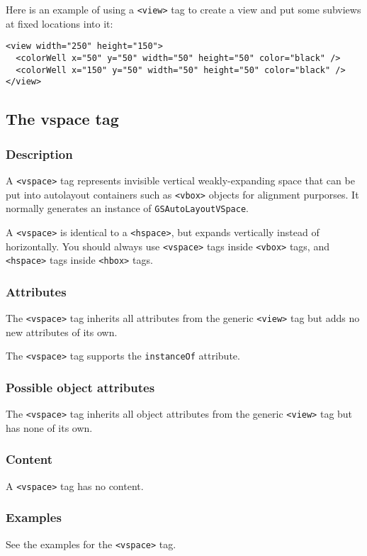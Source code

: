 Here is an example of using a \texttt{<view>} tag to create a view and
put some subviews at fixed locations into it:
\begin{verbatim}
<view width="250" height="150">
  <colorWell x="50" y="50" width="50" height="50" color="black" />
  <colorWell x="150" y="50" width="50" height="50" color="black" />
</view>
\end{verbatim}

\subsection{The vspace tag}

\subsubsection{Description}

A \texttt{<vspace>} tag represents invisible vertical weakly-expanding
space that can be put into autolayout containers such as
\texttt{<vbox>} objects for alignment purporses.  It normally
generates an instance of \texttt{GSAutoLayoutVSpace}.

A \texttt{<vspace>} is identical to a \texttt{<hspace>}, but expands
vertically instead of horizontally.  You should always use
\texttt{<vspace>} tags inside \texttt{<vbox>} tags, and
\texttt{<hspace>} tags inside \texttt{<hbox>} tags.

\subsubsection{Attributes}
The \texttt{<vspace>} tag inherits all attributes from the generic
\texttt{<view>} tag but adds no new attributes of its own.

The \texttt{<vspace>} tag supports the \texttt{instanceOf} attribute.

\subsubsection{Possible object attributes}
The \texttt{<vspace>} tag inherits all object attributes from the
generic \texttt{<view>} tag but has none of its own.

\subsubsection{Content}
A \texttt{<vspace>} tag has no content.

\subsubsection{Examples}
See the examples for the \texttt{<vspace>} tag.

